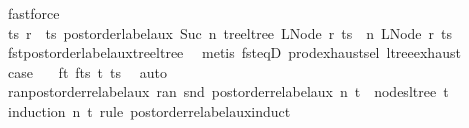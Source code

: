 \begin{isabellebody}
\ fastforce\isanewline
\ \ \isamarkupfalse%
\ \isamarkupfalse%
\ ts{\isacharprime}{\kern0pt}\ r{\isacharprime}{\kern0pt}\ \ ts{\isacharprime}{\kern0pt}{\isacharcolon}{\kern0pt}\ {\isachardoublequoteopen}postorder{\isacharunderscore}{\kern0pt}label{\isacharunderscore}{\kern0pt}aux\ {\isacharparenleft}{\kern0pt}Suc\ n{\isacharprime}{\kern0pt}{\isacharparenright}{\kern0pt}\ {\isacharparenleft}{\kern0pt}tree{\isacharunderscore}{\kern0pt}ltree\ {\isacharparenleft}{\kern0pt}LNode\ r\ ts{\isacharparenright}{\kern0pt}{\isacharparenright}{\kern0pt}\ {\isacharequal}{\kern0pt}\ {\isacharparenleft}{\kern0pt}n{\isacharprime}{\kern0pt}{\isacharprime}{\kern0pt}{\isacharcomma}{\kern0pt}\ LNode\ r{\isacharprime}{\kern0pt}\ ts{\isacharprime}{\kern0pt}{\isacharparenright}{\kern0pt}{\isachardoublequoteclose}\isanewline
\ \ \ \ \isamarkupfalse%
\ fst{\isacharunderscore}{\kern0pt}postorder{\isacharunderscore}{\kern0pt}label{\isacharunderscore}{\kern0pt}aux{\isacharunderscore}{\kern0pt}tree{\isacharunderscore}{\kern0pt}ltree\ \isamarkupfalse%
\ {\isacharparenleft}{\kern0pt}metis\ fst{\isacharunderscore}{\kern0pt}eqD\ prod{\isachardot}{\kern0pt}exhaust{\isacharunderscore}{\kern0pt}sel\ ltree{\isachardot}{\kern0pt}exhaust{\isacharparenright}{\kern0pt}\isanewline
\ \ \isamarkupfalse%
\ {\isacharquery}{\kern0pt}case\ \isamarkupfalse%
\ {}\ f{\isacharunderscore}{\kern0pt}t\ f{\isacharunderscore}{\kern0pt}ts\ t{\isacharprime}{\kern0pt}\ ts{\isacharprime}{\kern0pt}\ \isamarkupfalse%
\ auto\isanewline
{}\isamarkupfalse%
%
\endisatagproof
{\isafoldproof}%
%
\isadelimproof
\isanewline
%
\endisadelimproof
\isanewline
{}\isamarkupfalse%
\ ran{\isacharunderscore}{\kern0pt}postorder{\isacharunderscore}{\kern0pt}relabel{\isacharunderscore}{\kern0pt}aux{\isacharcolon}{\kern0pt}\ {\isachardoublequoteopen}ran\ {\isacharparenleft}{\kern0pt}snd\ {\isacharparenleft}{\kern0pt}postorder{\isacharunderscore}{\kern0pt}relabel{\isacharunderscore}{\kern0pt}aux\ n\ t{\isacharparenright}{\kern0pt}{\isacharparenright}{\kern0pt}\ {\isacharequal}{\kern0pt}\ nodes{\isacharunderscore}{\kern0pt}ltree\ t{\isachardoublequoteclose}\isanewline
%
\isadelimproof
%
\endisadelimproof
%
\isatagproof
{}\isamarkupfalse%
\ {\isacharparenleft}{\kern0pt}induction\ n\ t\ rule{\isacharcolon}{\kern0pt}\ postorder{\isacharunderscore}{\kern0pt}relabel{\isacharunderscore}{\kern0pt}aux{\isachardot}{\kern0pt}induct{\isacharparenright}{\kern0pt}\isanewline

\end{isabellebody}
